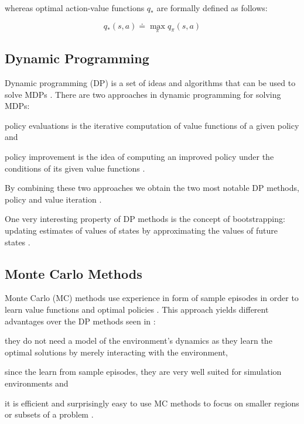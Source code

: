 \documentclass{seal_thesis}
\begin{document}
whereas optimal action-value functions $q_*$ are formally defined as follows:

\begin{equation}
	q_* (s,a) \doteq \max_\pi q_\pi (s,a)
\end{equation}

\subsection{Dynamic Programming}
\label{subsec:dp}

Dynamic programming (DP) is a set of ideas and algorithms that can be used to solve MDPs \cite[p. 95]{Sutton1998}. There are two approaches in dynamic programming for solving MDPs:
\begin{enumerate*}
	\item policy evaluations is the iterative computation of value functions of a given policy and
	\item policy improvement is the idea of computing an improved policy under the conditions of its given value functions \cite[p. 95]{Sutton1998}.
\end{enumerate*}

By combining these two approaches we obtain the two most notable DP methods, \ie policy and value iteration \cite[p. 95]{Sutton1998}.

One very interesting property of DP methods is the concept of bootstrapping: updating estimates of values of states by approximating the values of future states \cite[p. 96]{Sutton1998}.

\subsection{Monte Carlo Methods}

Monte Carlo (MC) methods use experience in form of sample episodes in order to learn value functions and optimal policies \cite[p. 123]{Sutton1998}. This approach yields different advantages over the DP methods seen in :
\begin{enumerate*}
	\item they do not need a model of the environment's dynamics as they learn the optimal solutions by merely interacting with the environment,
	\item since the learn from sample episodes, they are very well suited for simulation environments and
	\item it is efficient and surprisingly easy to use MC methods to focus on smaller regions or subsets of a problem \cite[p. 123]{Sutton1998}.
\end{enumerate*}
\end{document}
